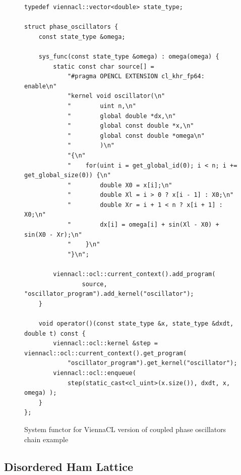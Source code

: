 \documentclass[1p]{elsarticle}
\begin{document}
\begin{figure}[p]
\begin{lstlisting}
typedef viennacl::vector<double> state_type;

struct phase_oscillators {
    const state_type &omega;

    sys_func(const state_type &omega) : omega(omega) {
        static const char source[] =
            "#pragma OPENCL EXTENSION cl_khr_fp64: enable\n"
            "kernel void oscillator(\n"
            "        uint n,\n"
            "        global double *dx,\n"
            "        global const double *x,\n"
            "        global const double *omega\n"
            "        )\n"
            "{\n"
            "    for(uint i = get_global_id(0); i < n; i += get_global_size(0)) {\n"
            "        double X0 = x[i];\n"
            "        double Xl = i > 0 ? x[i - 1] : X0;\n"
            "        double Xr = i + 1 < n ? x[i + 1] : X0;\n"
            "        dx[i] = omega[i] + sin(Xl - X0) + sin(X0 - Xr);\n"
            "    }\n"
            "}\n";

        viennacl::ocl::current_context().add_program(
                source, "oscillator_program").add_kernel("oscillator");
    }

    void operator()(const state_type &x, state_type &dxdt, double t) const {
        viennacl::ocl::kernel &step = viennacl::ocl::current_context().get_program(
            "oscillator_program").get_kernel("oscillator");
        viennacl::ocl::enqueue(
            step(static_cast<cl_uint>(x.size()), dxdt, x, omega) );
    }
};
\end{lstlisting}
\caption{System functor for ViennaCL version of coupled phase oscillators chain
example}
\label{code:viennacl:phase}
\end{figure}










%
%
\subsection{Disordered Ham Lattice}
\end{document}
